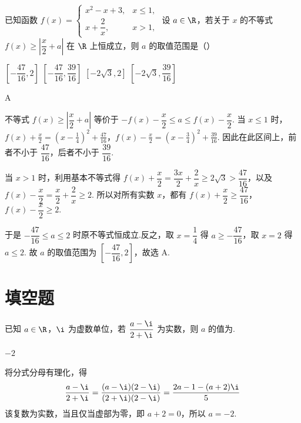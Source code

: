 \begin{problem}
已知函数 \(f(x)=
\begin{cases}
x^2-x+3,&x\le 1,\\
x+\dfrac{2}{x},&x>1,
\end{cases}\)
设 \(a\in\R\)，若关于 \(x\) 的不等式 \(f(x)\ge \left|\dfrac{x}{2}+a\right|\) 在 \(\R\) 上恒成立，则 \(a\) 的取值范围是（\quad）

\choices
    {\(\left[-\dfrac{47}{16},2\right]\)}
    {\(\left[-\dfrac{47}{16},\dfrac{39}{16}\right]\)}
    {\(\left[-2\sqrt{3},2\right]\)}
    {\(\left[-2\sqrt{3},\dfrac{39}{16}\right]\)}
\end{problem}

\begin{answer}
A
\end{answer}

\begin{solution}
不等式 \(f(x)\geq\left|\dfrac x2+a\right|\) 等价于
\(-f(x)-\dfrac x2\leq a\leq f(x)-\dfrac x2\). 当 \(x\leq1\) 时，
\(f(x)+\frac x2=\left(x-\frac14\right)^2+\frac{47}{16}\)，\(f(x)-\frac x2=\left(x-\frac34\right)^2+\frac{39}{16}\).
因此在此区间上，前者不小于 \(\dfrac{47}{16}\)，后者不小于 \(\dfrac{39}{16}\).

当 \(x>1\) 时，利用基本不等式得
\(f(x)+\dfrac x2=\dfrac{3x}{2}+\dfrac2x\geq2\sqrt3>\dfrac{47}{16}\)，以及
\(f(x)-\dfrac x2=\dfrac x2+\dfrac2x\geq2\). 所以对所有实数 \(x\)，都有
\(f(x)+\dfrac x2\geq\dfrac{47}{16}\)，\(f(x)-\dfrac x2\geq2\).

于是 \(-\dfrac{47}{16}\leq a\leq2\) 时原不等式恒成立.反之，取 \(x=\dfrac14\) 得
\(a\geq-\dfrac{47}{16}\)，取 \(x=2\) 得 \(a\leq2\). 故 \(a\) 的取值范围为
\(\left[-\dfrac{47}{16},2\right]\)，故选 A.
\end{solution}

\section{填空题}

\begin{problem}
已知 \(a\in\R\)，\(\i\) 为虚数单位，若 \(\dfrac{a-\i}{2+\i}\) 为实数，则 \(a\) 的值为\fillinblank{}.
\end{problem}

\begin{answer}
\(-2\)
\end{answer}

\begin{solution}
将分式分母有理化，得
\[
\frac{a-\i}{2+\i}=\frac{(a-\i)(2-\i)}{(2+\i)(2-\i)}
 =\frac{2a-1-(a+2)\i}{5}
\]
该复数为实数，当且仅当虚部为零，即 \(a+2=0\)，所以 \(a=-2\).
\end{solution}

